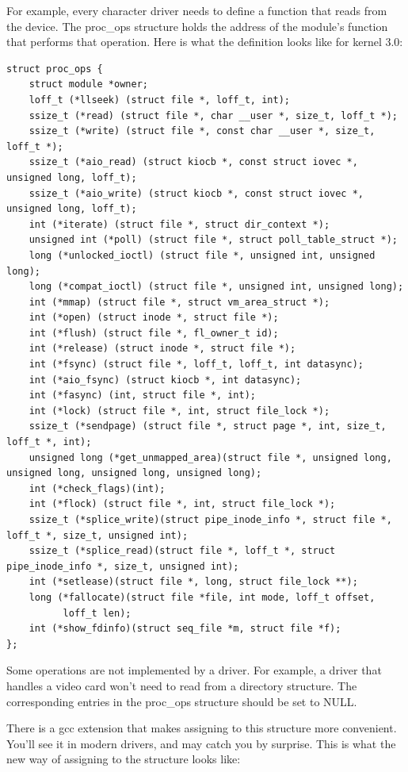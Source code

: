 \documentclass[11pt]{article}
\begin{document}
For example, every character driver needs to define a function that reads from the device. The proc\_ops structure holds the address of the module's function that performs that operation. Here is what the definition looks like for kernel 3.0:

\begin{verbatim}
struct proc_ops {
    struct module *owner;
    loff_t (*llseek) (struct file *, loff_t, int);
    ssize_t (*read) (struct file *, char __user *, size_t, loff_t *);
    ssize_t (*write) (struct file *, const char __user *, size_t, loff_t *);
    ssize_t (*aio_read) (struct kiocb *, const struct iovec *, unsigned long, loff_t);
    ssize_t (*aio_write) (struct kiocb *, const struct iovec *, unsigned long, loff_t);
    int (*iterate) (struct file *, struct dir_context *);
    unsigned int (*poll) (struct file *, struct poll_table_struct *);
    long (*unlocked_ioctl) (struct file *, unsigned int, unsigned long);
    long (*compat_ioctl) (struct file *, unsigned int, unsigned long);
    int (*mmap) (struct file *, struct vm_area_struct *);
    int (*open) (struct inode *, struct file *);
    int (*flush) (struct file *, fl_owner_t id);
    int (*release) (struct inode *, struct file *);
    int (*fsync) (struct file *, loff_t, loff_t, int datasync);
    int (*aio_fsync) (struct kiocb *, int datasync);
    int (*fasync) (int, struct file *, int);
    int (*lock) (struct file *, int, struct file_lock *);
    ssize_t (*sendpage) (struct file *, struct page *, int, size_t, loff_t *, int);
    unsigned long (*get_unmapped_area)(struct file *, unsigned long, unsigned long, unsigned long, unsigned long);
    int (*check_flags)(int);
    int (*flock) (struct file *, int, struct file_lock *);
    ssize_t (*splice_write)(struct pipe_inode_info *, struct file *, loff_t *, size_t, unsigned int);
    ssize_t (*splice_read)(struct file *, loff_t *, struct pipe_inode_info *, size_t, unsigned int);
    int (*setlease)(struct file *, long, struct file_lock **);
    long (*fallocate)(struct file *file, int mode, loff_t offset,
	      loff_t len);
    int (*show_fdinfo)(struct seq_file *m, struct file *f);
};
\end{verbatim}

Some operations are not implemented by a driver. For example, a driver that handles a video card won't need to read from a directory structure. The corresponding entries in the proc\_ops structure should be set to NULL.

There is a gcc extension that makes assigning to this structure more convenient. You'll see it in modern drivers, and may catch you by surprise. This is what the new way of assigning to the structure looks like:
\end{document}
